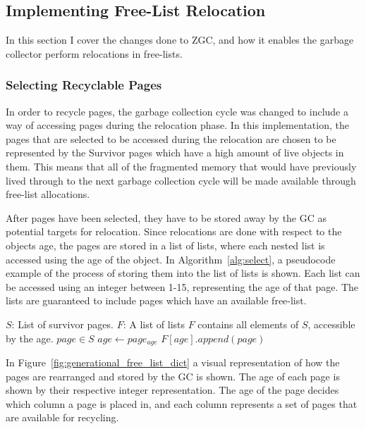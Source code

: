 \subsection{Implementing Free-List Relocation}
In this section I cover the changes done to ZGC, and how it enables the garbage collector perform relocations in free-lists.
\subsubsection{Selecting Recyclable Pages}
\label{sec:implement-select}
In order to recycle pages, the garbage collection cycle was changed to include a way of accessing pages during the relocation phase. In this implementation, the pages that are selected to be accessed during the relocation are chosen to be represented by the Survivor pages which have a high amount of live objects in them. This means that all of the fragmented memory that would have previously lived through to the next garbage collection cycle will be made available through free-list allocations.

After pages have been selected, they have to be stored away by the GC as potential targets for relocation. Since relocations are done with respect to the objects age, the pages are stored in a list of lists, where each nested list is accessed using the age of the object. In Algorithm~\ref{alg:select}, a pseudocode example of the process of storing them into the list of lists is shown. Each list can be accessed using an integer between 1-15, representing the age of that page. The lists are guaranteed to include pages which have an available free-list. 

\begin{algorithm}[H]
    \caption{$(O, T, F)$}
    \label{alg:select}
    \begin{algorithmic}[1]
        \Require 
        \Statex $S$: List of survivor pages.
        \Statex $F$: A list of lists
        \Ensure 
        \Statex $F$ contains all elements of $S$, accessible by the age.
        \ForAll $page \in S$
            \State $age \gets page_{age}$
            \State $F[age].append(page)$
        \EndFor
    \end{algorithmic}
\end{algorithm}

In Figure~\ref{fig:generational_free_list_dict} a visual representation of how the pages are rearranged and stored by the GC is shown. The age of each page is shown by their respective integer representation. The age of the page decides which column a page is placed in, and each column represents a set of pages that are available for recycling.

